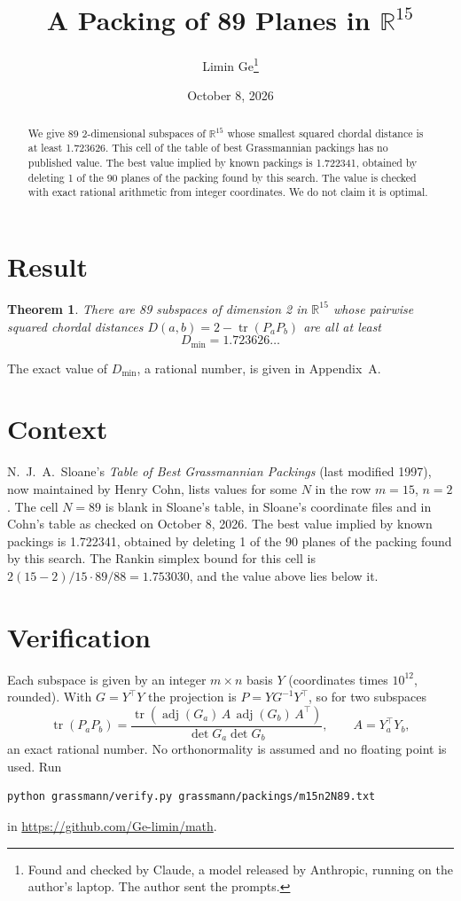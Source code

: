 \documentclass[11pt,a4paper]{article}
\title{A Packing of 89 Planes in $\mathbb{R}^{15}$}
\author{Limin Ge\thanks{Found and checked by Claude, a model released by Anthropic, running on the author's laptop. The author sent the prompts.}}
\date{October 8, 2026}
\newtheorem*{theorem}{Theorem}
\begin{document}
\maketitle
\begin{abstract}
We give 89 2-dimensional subspaces of $\mathbb{R}^{15}$ whose smallest squared chordal distance is at least 1.723626. This cell of the table of best Grassmannian packings has no published value. The best value implied by known packings is 1.722341, obtained by deleting 1 of the 90 planes of the packing found by this search. The value is checked with exact rational arithmetic from integer coordinates. We do not claim it is optimal.
\end{abstract}

\section{Result}
\begin{theorem}
There are 89 subspaces of dimension 2 in $\mathbb{R}^{15}$ whose pairwise squared chordal distances $D(a,b) = 2 - \operatorname{tr}(P_aP_b)$ are all at least
\[ D_{\min} = 1.723626\ldots \]
\end{theorem}
The exact value of $D_{\min}$, a rational number, is given in Appendix~A.


\section{Context}
N.~J.~A.~Sloane's \emph{Table of Best Grassmannian Packings} (last modified 1997), now maintained by Henry Cohn, lists values for some $N$ in the row $m=15$, $n=2$. The cell $N=89$ is blank in Sloane's table, in Sloane's coordinate files and in Cohn's table as checked on October 8, 2026. The best value implied by known packings is 1.722341, obtained by deleting 1 of the 90 planes of the packing found by this search. The Rankin simplex bound for this cell is $2(15-2)/15\cdot 89/88 = 1.753030$, and the value above lies below it.


\section{Verification}
Each subspace is given by an integer $m\times n$ basis $Y$ (coordinates times $10^{12}$, rounded). With $G=Y^\top Y$ the projection is $P=YG^{-1}Y^\top$, so for two subspaces
\[ \operatorname{tr}(P_aP_b)=\frac{\operatorname{tr}(\operatorname{adj}(G_a)\,A\,\operatorname{adj}(G_b)\,A^\top)}{\det G_a\det G_b},\qquad A=Y_a^\top Y_b, \]
an exact rational number. No orthonormality is assumed and no floating point is used. Run
\begin{verbatim}
python grassmann/verify.py grassmann/packings/m15n2N89.txt
\end{verbatim}
in \url{https://github.com/Ge-limin/math}.
\end{document}
